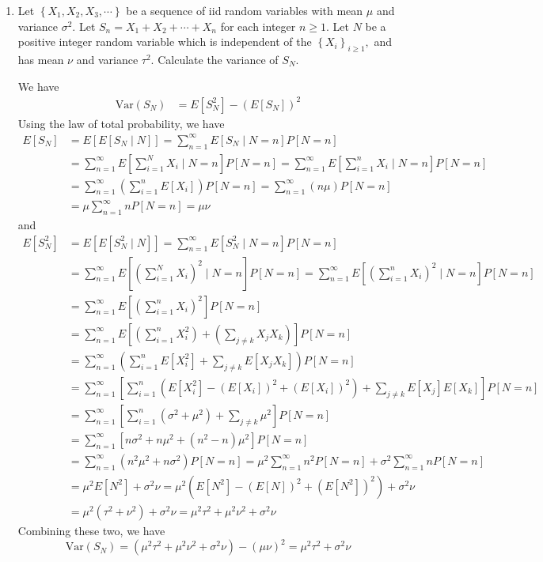 \documentclass{article}
\newcommand{\var}{\mathrm{Var}}
\begin{document}
\begin{enumerate}
	\item Let $\left\{ X_1, X_2, X_3, \cdots \right\}$ be a sequence of iid random variables with mean $\mu$ and variance $\sigma^2.$ Let $S_n=X_1+X_2+\cdots+X_n$ for each integer $n\ge1.$ Let $N$ be a positive integer random variable which is independent of the $\left\{ X_i \right\}_{i\ge1},$ and has mean $\nu$ and variance $\tau^2.$ Calculate the variance of $S_N.$
		\begin{soln}
			We have
			\begin{align*}
				\var(S_N) &= E[S_N^2]-(E[S_N])^2
			\end{align*}
			Using the law of total probability, we have
			\begin{align*}
				E[S_N] &= E\left[ E[S_N\mid N] \right] = \sum_{n=1}^{\infty}E[S_N\mid N=n]P[N=n] \\
				&= \sum_{n=1}^{\infty}E\left[ \sum_{i=1}^{N} X_i \mid N=n\right]P[N=n] = \sum_{n=1}^{\infty}E\left[ \sum_{i=1}^{n} X_i\mid N=n \right] P[N=n] \\
				&= \sum_{n=1}^{\infty}\left(\sum_{i=1}^{n} E[X_i]\right) P[N=n] = \sum_{n=1}^{\infty} (n\mu)P[N=n] \\
				&= \mu \sum_{n=1}^{\infty}nP[N=n] = \mu\nu
			\end{align*}
			and 
			\begin{align*}
				E[S_N^2] &= E\left[ E[S_N^2\mid N] \right] = \sum_{n=1}^{\infty} E[S_N^2\mid N=n] P[N=n] \\
				&= \sum_{n=1}^{\infty}E\left[ \left( \sum_{i=1}^{N} X_i \right)^2\mid N=n \right]P[N=n] = \sum_{n=1}^{\infty}E\left[ \left( \sum_{i=1}^{n} X_i \right)^2\mid N=n \right]P[N=n] \\
				&= \sum_{n=1}^{\infty} E\left[ \left( \sum_{i=1}^{n} X_i \right)^2 \right] P[N=n] \\
				&= \sum_{n=1}^{\infty} E\left[ \left( \sum_{i=1}^{n} X_i^2 \right) + \left( \sum_{j\neq k}^{} X_j X_k \right) \right] P[N=n] \\
				&= \sum_{n=1}^{\infty} \left( \sum_{i=1}^{n} E[X_i^2] + \sum_{j\neq k}^{} E[X_j X_k] \right) P[N=n] \\
				&= \sum_{n=1}^{\infty} \left[ \sum_{i=1}^{n} \left( E[X_i^2]-(E[X_i])^2 + (E[X_i])^2 \right) + \sum_{j\neq k}^{}E[X_j]E[X_k] \right]P[N=n] \\
				&= \sum_{n=1}^{\infty} \left[ \sum_{i=1}^{n} (\sigma^2+\mu^2) + \sum_{j\neq k}^{} \mu^2 \right]P[N=n] \\
				&= \sum_{n=1}^{\infty} \left[ n\sigma^2+n\mu^2 + (n^2-n)\mu^2 \right]P[N=n] \\
				&= \sum_{n=1}^{\infty} (n^2\mu^2 + n\sigma^2)P[N=n] = \mu^2\sum_{n=1}^{\infty} n^2P[N=n] + \sigma^2\sum_{n=1}^{\infty} nP[N=n] \\
				&= \mu^2 E[N^2] + \sigma^2 \nu = \mu^2\left( E[N^2]-(E[N])^2 + (E[N^2])^2 \right) + \sigma^2 \nu \\
				&= \mu^2(\tau^2+\nu^2) + \sigma^2\nu = \mu^2\tau^2 + \mu^2\nu^2 + \sigma^2\nu
			\end{align*}
			Combining these two, we have
			\[\var(S_N) = (\mu^2\tau^2+\mu^2\nu^2+\sigma^2\nu) - (\mu\nu)^2 = \mu^2\tau^2+\sigma^2\nu\]
		\end{soln}


\end{enumerate}
\end{document}
